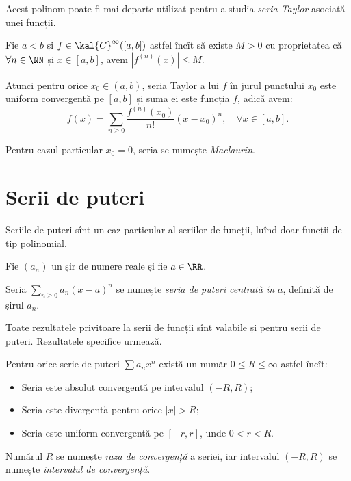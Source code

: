 Acest polinom poate fi mai departe utilizat pentru a studia \emph{seria Taylor}
asociată unei funcții.

\begin{theorem}\label{thm:seria-taylor}
  Fie $ a < b $ și $ f \in \kal{C}^\infty([a,b]) $ astfel încît să existe
  $ M > 0 $ cu proprietatea că $ \forall n \in \NN $ și $ x \in [a, b] $, avem
  $ |f^{(n)}(x)| \leq M $.

  Atunci pentru orice $ x_0 \in (a,b) $, seria Taylor a lui $ f $ în jurul
  punctului $ x_0 $ este uniform convergentă pe $ [a,b] $ și suma ei este
  funcția $ f $, adică avem:
  \[
    f(x) = \sum_{n \geq 0} \frac{f^{(n)}(x_0)}{n!} (x - x_0)^n, \quad %
    \forall x \in [a,b].
  \]
\end{theorem}

Pentru cazul particular $ x_0 = 0 $, seria se numește \emph{Maclaurin}.


\section{Serii de puteri}

Seriile de puteri sînt un caz particular al seriilor de funcții, luînd doar
funcții de tip polinomial.

\begin{definition}\label{def:serii-puteri}
  Fie $ (a_n) $ un șir de numere reale și fie $ a \in \RR $.

  Seria $ \sum_{n \geq 0} a_n(x - a)^n $ se numește \emph{seria de puteri %
  centrată în $ a $}, definită de șirul $ a_n $.
\end{definition}

Toate rezultatele privitoare la serii de funcții sînt valabile
și pentru serii de puteri. Rezultatele specifice urmează.

\begin{theorem}[Abel]\label{thm:abel-s-put}
  Pentru orice serie de puteri $ \sum a_n x^n $ există un număr
  $ 0 \leq R \leq \infty $ astfel încît:
  \begin{itemize}
  \item Seria este absolut convergentă pe intervalul $ (-R, R) $;
  \item Seria este divergentă pentru orice $ |x| > R $;
  \item Seria este uniform convergentă pe $ [-r, r] $, unde $ 0 < r < R $.
  \end{itemize}

  Numărul $ R $ se numește \emph{raza de convergență} a seriei, iar
  intervalul $ (-R, R) $ se numește \emph{intervalul de convergență}.
\end{theorem}

